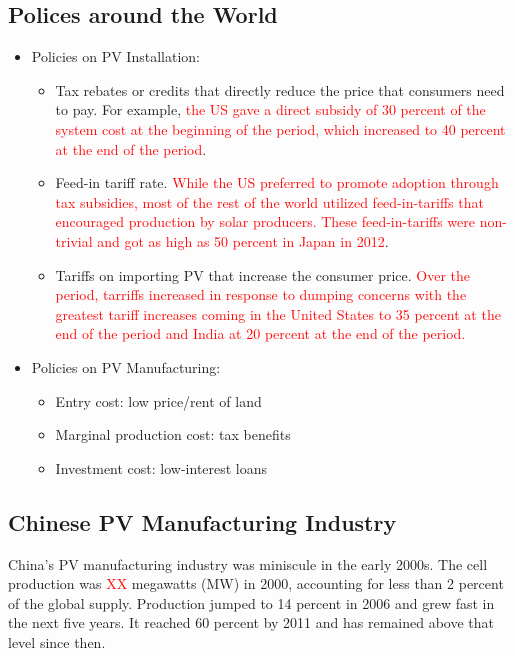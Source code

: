 \documentclass[12pt]{article}
\begin{document}
\subsection{Polices around the World}
\label{subsec:inst_global_policy}

\begin{itemize}
    \item Policies on PV Installation:
        \begin{itemize}
        \item Tax rebates or credits that directly reduce the price that consumers need to pay. For example, \textcolor{red}{the US gave a direct subsidy of 30 percent of the system cost at the beginning of the period, which increased to 40 percent at the end of the period}.
        \item Feed-in tariff rate. \textcolor{red}{While the US preferred to promote adoption through tax subsidies, most of the rest of the world utilized feed-in-tariffs that encouraged production by solar producers. These feed-in-tariffs were non-trivial and got as high as 50 percent in Japan in 2012}.
        \item Tariffs on importing PV that increase the consumer price. \textcolor{red}{Over the period, tarriffs increased in response to dumping concerns with the greatest tariff increases coming in the United States to 35 percent at the end of the period and India at 20 percent at the end of the period.}
        \end{itemize}
    \item Policies on PV Manufacturing:
        \begin{itemize}
        \item Entry cost: low price/rent of land
        \item Marginal production cost: tax benefits
        \item Investment cost: low-interest loans
        \end{itemize}
\end{itemize}

\subsection{Chinese PV Manufacturing Industry}
\label{subsec:inst_china_PV}

China's PV manufacturing industry was miniscule in the early 2000s. 
The cell production was \textcolor{red}{XX} megawatts (MW) in 2000, accounting for less than 2 percent of the global supply. Production jumped to 14 percent in 2006 and grew fast in the next five years. It reached 60 percent by 2011 and has remained above that level since then.
\end{document}
